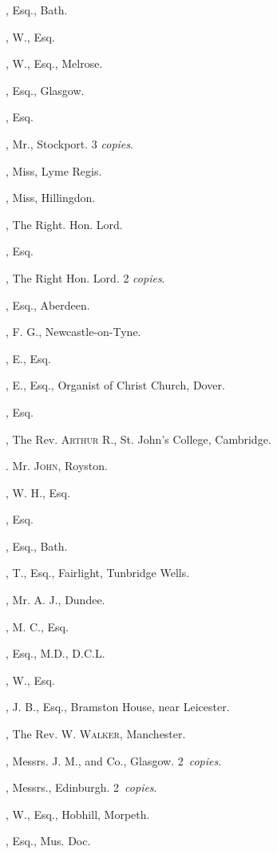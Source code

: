 \begin{multicols}{2}
, Esq., Bath.

, W., Esq.

, W., Esq., Melrose.

, Esq., Glasgow.

, Esq.

, Mr., Stockport. 3 \textit{copies}.

, Miss, Lyme Regis.

, Miss, Hillingdon.
\bigskip

, The Right. Hon. Lord.

, Esq.
\bigskip

, The Right Hon. Lord. 2 \textit{copies}.

, Esq., Aberdeen.

, F. G., Newcastle-on-Tyne.

, E., Esq.

, E., Esq., Organist of Christ
Church, Dover.

, Esq.

, The Rev. \textsc{Arthur} R., St. John’s
College, Cambridge.

. Mr. \textsc{John}, Royston.

, W. H., Esq.

, Esq.

, Esq., Bath.

, T., Esq., Fairlight, Tunbridge
Wells.

, Mr. A. J., Dundee.

, M. C., Esq.

, Esq., M.D., D.C.L.

, W., Esq.

, J. B., Esq., Bramston House,
near Leicester.

, The Rev. W. \textsc{Walker}, Manchester.

, Messrs. J. M., and Co., Glasgow.
2~\textit{copies}.

, Messrs., Edinburgh. 2~\textit{copies}.

, W., Esq., Hobhill, Morpeth.

, Esq., Mus. Doc.
\end{multicols}
\setlength{\columnseprule}{0pt}


